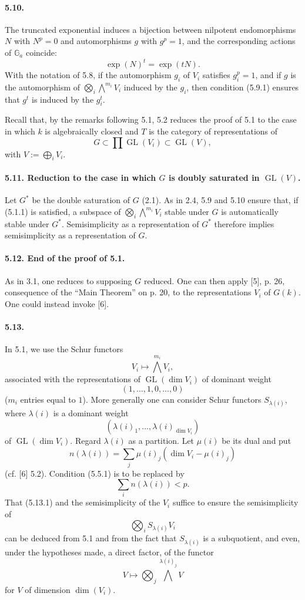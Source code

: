 \documentclass[11pt]{article}
\newcommand{\Ga}{\mathbb{G}_a}
\newcommand{\GL}{\operatorname{GL}}
\theoremstyle{plain}
\theoremstyle{definition}
\begin{document}
\paragraph{5.10.} The truncated exponential induces a bijection between nilpotent endomorphisms $N$ with $N^p=0$ and automorphisms $g$ with $g^p=1$, and the corresponding actions of $\Ga$ coincide:
\[
   \exp(N)^t=\exp(tN).
\]
With the notation of 5.8, if the automorphism $g_i$ of $V_i$ satisfies $g_i^p=1$, and if $g$ is the automorphism of $\bigotimes_i\bigwedge^{m_i}V_i$ induced by the $g_i$, then condition (5.9.1) ensures that $g^t$ is induced by the $g_i^t$.

Recall that, by the remarks following 5.1, 5.2 reduces the proof of 5.1 to the case in which $k$ is algebraically closed and $T$ is the category of representations of
\[
   G\subset\prod \GL(V_i)\subset\GL(V),
\]
with $V:=\bigoplus_i V_i$.

\paragraph{5.11. Reduction to the case in which $G$ is doubly saturated in $\GL(V)$.} Let $G^*$ be the double saturation of $G$ (2.1). As in 2.4, 5.9 and 5.10 ensure that, if (5.1.1) is satisfied, a subspace of $\bigotimes_i\bigwedge^{m_i}V_i$ stable under $G$ is automatically stable under $G^*$. Semisimplicity as a representation of $G^*$ therefore implies semisimplicity as a representation of $G$.

\paragraph{5.12. End of the proof of 5.1.} As in 3.1, one reduces to supposing $G$ reduced. One can then apply [5], p. 26, consequence of the ``Main Theorem'' on p. 20, to the representations $V_i$ of $G(k)$. One could instead invoke [6].

\paragraph{5.13.} In 5.1, we use the Schur functors
\[
   V_i\longmapsto \bigwedge^{m_i}V_i,
\]
associated with the representations of $\GL(\dim V_i)$ of dominant weight
\[
   (1,\ldots,1,0,\ldots,0)
\]
($m_i$ entries equal to $1$). More generally one can consider Schur functors $S_{\lambda(i)}$, where $\lambda(i)$ is a dominant weight
\[
   (\lambda(i)_1,\ldots,\lambda(i)_{\dim V_i})
\]
of $\GL(\dim V_i)$. Regard $\lambda(i)$ as a partition. Let $\mu(i)$ be its dual and put
\[
   n(\lambda(i))=\sum_j \mu(i)_j(\dim V_i-\mu(i)_j)
\]
(cf. [6] 5.2). Condition (5.5.1) is to be replaced by
\begin{equation}\tag{5.13.1}
   \sum_i n(\lambda(i))<p.
\end{equation}
That (5.13.1) and the semisimplicity of the $V_i$ suffice to ensure the semisimplicity of
\[
   \bigotimes_i S_{\lambda(i)}V_i
\]
can be deduced from 5.1 and from the fact that $S_{\lambda(i)}$ is a subquotient, and even, under the hypotheses made, a direct factor, of the functor
\[
   V\longmapsto \bigotimes_j \bigwedge^{\lambda(i)_j} V
\]
for $V$ of dimension $\dim(V_i)$.
\end{document}
